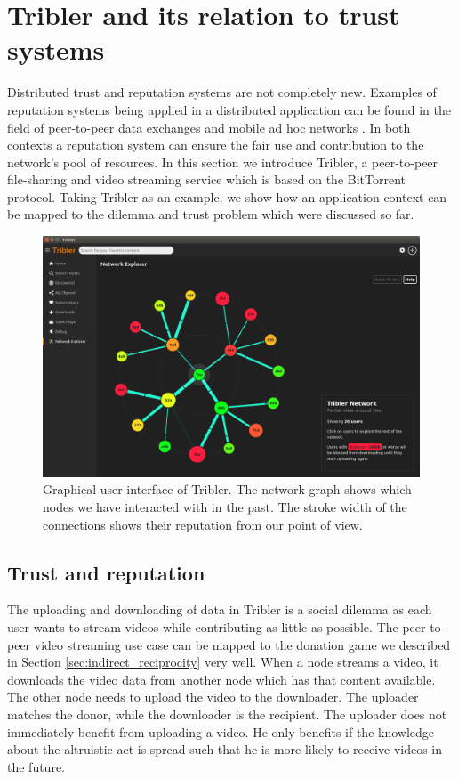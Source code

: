 \section{Tribler and its relation to trust systems}
\label{sec:tribler}
Distributed trust and reputation systems are not completely new. Examples of reputation systems
being applied in a distributed application can be found in the field of peer-to-peer
data exchanges and mobile ad hoc networks \cite{HENDRIKX2015184}. In both contexts a reputation system
can ensure the fair use and contribution to the network's pool of resources. In this section we 
introduce Tribler, a peer-to-peer file-sharing and video streaming service which is based on the 
BitTorrent protocol. Taking Tribler as an example, we show how an application context can be mapped to 
the dilemma and trust problem which were discussed so far.

\begin{figure}
    \centering
    \includegraphics[width=\textwidth]{images/tribler}
    \caption{Graphical user interface of Tribler. The network graph shows which nodes we have 
    interacted with in the past. The stroke width of the connections shows their reputation from 
    our point of view.}
    \label{fig:tribler}
\end{figure}

\subsection{Trust and reputation}
The uploading and downloading of data in Tribler is a social dilemma as each user wants to 
stream videos while contributing as little as possible.
The peer-to-peer video streaming use case can be mapped to the donation game we described in 
Section \ref{sec:indirect_reciprocity} very well. When a node streams a video, it downloads the video
data from another node which has that content available. The other node needs to upload the video to
the downloader. The uploader matches the donor, while the downloader is the recipient. The uploader
does not immediately benefit from uploading a video. He only benefits if the knowledge about the 
altruistic act is spread such that he is more likely to receive videos in the future.

